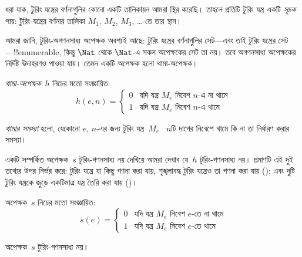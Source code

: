\documentclass[../../../include/open-logic-section]{subfiles}
\begin{document}

\begin{explain}
ধরা যাক, টুরিং যন্ত্রের বর্ণনাগুলির কোনো একটি তালিকায়ন আমরা স্থির করেছি।
তাহলে প্রতিটি টুরিং যন্ত্র একটি \emph{সূচক} পায়: টুরিং-যন্ত্রের বর্ণনার
তালিকা $M_1$, $M_2$, $M_3$, \dots{}-তে তার স্থান।

আমরা জানি, টুরিং-অগণনসাধ্য অপেক্ষক অবশ্যই আছে: টুরিং যন্ত্রের
বর্ণনাগুলির সেট—এবং তাই টুরিং যন্ত্রের সেট—!!{enumerable}, কিন্তু
$\Nat$ থেকে $\Nat$-এ সকল অপেক্ষকের সেট তা নয়। তবে অগণনসাধ্য অপেক্ষকের
নির্দিষ্ট উদাহরণও পাওয়া যায়। তেমন একটি অপেক্ষক হলো থামা-অপেক্ষক।
\end{explain}

\begin{defn}[থামা-অপেক্ষক]
 \emph{থামা-অপেক্ষক}~$h$ নিচের মতো সংজ্ঞায়িত:
\[
h(e,n) =
\begin{cases}
  \text{0} & \text{যদি যন্ত্র~$M_e$ নিবেশ $n$-এ না থামে} \\
  \text{1} & \text{যদি যন্ত্র~$M_e$ নিবেশ $n$-এ থামে}
\end{cases}
\]
\end{defn}

\begin{defn}[থামার সমস্যা]
\emph{থামার সমস্যা} হলো, যেকোনো $e$, $n$-এর জন্য টুরিং যন্ত্র~$M_e$
~$n$টি দাগের নিবেশে থামে কি না তা নির্ধারণ করার সমস্যা।
\end{defn}

\begin{explain}
একটি সম্পর্কিত অপেক্ষক~$s$ টুরিং-গণনসাধ্য নয় দেখিয়ে আমরা দেখাব
যে~$h$ টুরিং-গণনসাধ্য নয়। প্রমাণটি এই দুই তথ্যের উপর নির্ভর করে: টুরিং
যন্ত্রে যা কিছু গণনা করা যায়, শৃঙ্খলাবদ্ধ টুরিং যন্ত্রেও তা গণনা করা যায়
(); এবং দুটি টুরিং যন্ত্রকে জুড়ে একটিমাত্র যন্ত্র
তৈরি করা যায় ()।
\end{explain}

\begin{defn} অপেক্ষক~$s$ নিচের মতো সংজ্ঞায়িত:
\[
s(e) =
\begin{cases}
  \text{0} & \text{যদি যন্ত্র~$M_e$ নিবেশ $e$-তে না থামে} \\
  \text{1} & \text{যদি যন্ত্র~$M_e$ নিবেশ $e$-তে থামে}
\end{cases}
\]
\end{defn}

\begin{lem}
অপেক্ষক~$s$ টুরিং-গণনসাধ্য নয়।
\end{lem}
\end{document}
